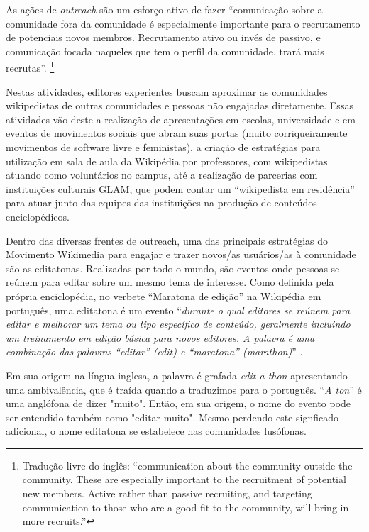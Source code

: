As ações de \textit{outreach} são um esforço ativo de fazer ``comunicação sobre a comunidade fora da comunidade é especialmente importante para o recrutamento de potenciais novos membros. Recrutamento ativo ou invés de passivo, e comunicação focada naqueles que tem o perfil da comunidade, trará mais recrutas''\citep[p.37/38]{kraut_dealing_2010}. \footnote{Tradução livre do inglês: ``communication about the community outside the community. These are especially important to the recruitment of potential new members. Active rather than passive recruiting, and targeting communication to those who are a good fit to the community, will bring in more recruits.''}

Nestas atividades, editores experientes buscam aproximar as comunidades wikipedistas de outras comunidades e pessoas não engajadas diretamente. Essas atividades vão deste a realização de apresentações em escolas, universidade e em eventos de movimentos sociais que abram suas portas (muito corriqueiramente movimentos de software livre e feministas), \citep{farzan_bring_2016} a criação de estratégias para utilização em sala de aula da Wikipédia por professores, com wikipedistas atuando como voluntários no campus, \citep{marques_trabalhando_2012} até a realização de parcerias com instituições culturais GLAM, que podem contar um ``wikipedista em residência'' para atuar junto das equipes das instituições na produção de conteúdos enciclopédicos. \citep{stinson_stepping_2018}

Dentro das diversas frentes de outreach, uma das principais estratégias do Movimento Wikimedia para engajar e trazer novos/as usuários/as à comunidade são as editatonas. Realizadas por todo o mundo, são eventos onde pessoas se reúnem para editar sobre um mesmo tema de interesse. \citep{littlejohn_learning_2019} Como definida pela própria enciclopédia, no verbete ``Maratona de edição'' na Wikipédia em português, uma editatona é um evento ``\textit{durante o qual editores se reúnem para editar e melhorar um tema ou tipo específico de conteúdo, geralmente incluindo um treinamento em edição básica para novos editores. A palavra é uma combinação das palavras ``editar'' (\textit{edit}) e ``maratona'' (\textit{marathon})}'' .

Em sua origem na língua inglesa, a palavra é grafada \textit{edit-a-thon} apresentando uma ambivalência, que é traída quando a traduzimos para o português. ``\textit{A ton}'' é uma anglófona de dizer "muito". Então, em sua origem, o nome do evento pode ser entendido também como "editar muito". Mesmo perdendo este signficado adicional, o nome editatona se estabelece nas comunidades lusófonas.

